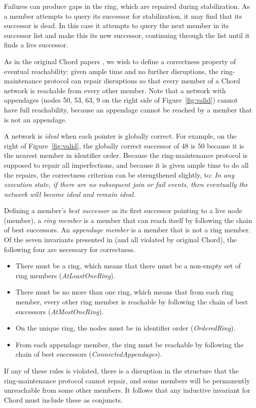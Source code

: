 \documentclass[conference]{IEEEtran}
\begin{document}
Failures can produce gaps in the ring, which are repaired during
stabilization.
As a member attempts to query its successor for stabilization, 
it may find that its
successor is dead.
In this case it attempts to query the next member in its successor
list and make this its new successor, continuing through the list
until it finds a
live successor.

As in the original Chord papers \cite{chord-sigcomm,chord-ton},
we wish to define a correctness property of eventual reachability:
given ample time and no further disruptions, 
the ring-maintenance protocol can repair disruptions so that
every member of a Chord network is reachable from every other member.
Note that a network with appendages (nodes 50, 53, 63, 9 on the right
side of Figure~\ref{fig:valid}) cannot have full reachability,
because an appendage cannot be reached by a member that is not an
appendage.

A network is {\it ideal} when each pointer is globally correct.
For example, on the right of Figure~\ref{fig:valid}, the globally correct
successor of 48 is 50 because it is the nearest member in identifier
order.
Because the ring-maintenance protocol is supposed to repair all
imperfections, and because it is given ample time to do all
the repairs, the correctness criterion can be strengthened
slightly, to:
{\it In any execution state, if there are no
subsequent join or fail events, then eventually the network will become
ideal and remain ideal.}

Defining a member's {\it best successor} as its first successor pointing
to a live node (member), a {\it ring member} is a member that can reach
itself by following the chain of best successors.
An {\it appendage member} is a member that is not a ring member.
Of the seven invariants presented in
\cite{chord-podc} (and all violated by original Chord),
the following four are necessary for correctness.
\begin{itemize}
\item
There must be a ring, which means that there must be a non-empty set
of ring members ({\it AtLeastOneRing}).
\item
There must be no more than one ring, which means that from each ring
member, every other ring member is reachable by following the chain
of best successors ({\it AtMostOneRing}).
\item
On the unique ring, the nodes must be in identifier 
order ({\it OrderedRing}).
\item
From each appendage member, the ring must be reachable by following
the chain of
best successors ({\it ConnectedAppendages}).
\end{itemize}
If any of these rules is violated,
there is a disruption in the structure that
the ring-maintenance protocol cannot repair, and some members
will be permanently unreachable from some other members.
It follows that any inductive invariant for Chord must include these
as conjuncts.
\end{document}
